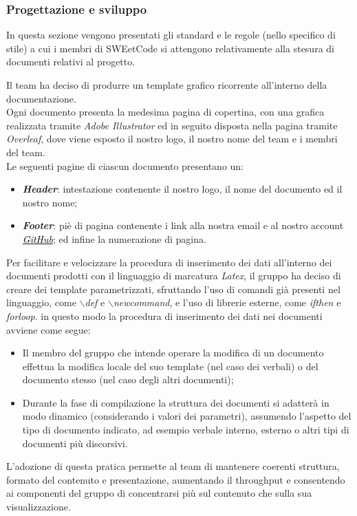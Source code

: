 \documentclass[10pt, a4paper]{article}
\begin{document}
\subsubsection{Progettazione e sviluppo}
In questa sezione vengono presentati gli standard e le regole (nello specifico di stile) a cui i membri di SWEetCode si attengono 
relativamente alla stesura di documenti relativi al progetto. 
    
    Il team ha deciso di produrre un template grafico ricorrente all'interno della documentazione.\\
    Ogni documento presenta la medesima pagina di copertina, con una grafica realizzata tramite \textit{Adobe Illustrator} ed in seguito 
    disposta nella pagina tramite \textit{Overleaf}, dove viene esposto il nostro logo, il nostro nome del team e i membri del team.\\
    Le seguenti pagine di ciascun documento presentano un:
        \begin{itemize}
            \item \textbf{\textit{Header}}: intestazione contenente il nostro logo, il nome del documento ed il nostro nome;
            \item \textbf{\textit{Footer}}: piè di pagina contenente i link alla nostra email e al nostro account \href{https://sweetcode-team.github.io/}{\textcolor{black}{\textit{GitHub\pg}}}; 
            ed infine la numerazione di pagina.
        \end{itemize}

     Per facilitare e velocizzare la procedura di inserimento dei dati all'interno dei documenti prodotti con 
    il linguaggio di marcatura \textit{Latex}, il gruppo ha deciso di creare dei template parametrizzati, sfruttando l'uso di comandi già 
    presenti nel linguaggio, come \textit{$\backslash$def} e \textit{$\backslash$newcommand}, e l'uso di librerie esterne, come 
    \textit{ifthen} e \textit{forloop}. in questo modo la procedura di inserimento dei dati nei documenti avviene come segue:
    \begin{itemize}
        \item Il membro del gruppo che intende operare la modifica di un documento effettua la modifica locale del suo template (nel caso dei verbali) o del documento stesso (nel caso degli altri documenti);
        \item Durante la fase di compilazione la struttura dei documenti si adatterà in modo dinamico (considerando i valori dei parametri), assumendo 
        l'aspetto del tipo di documento indicato, ad esempio verbale interno, esterno o altri tipi di documenti più discorsivi.
    \end{itemize}
    L'adozione di 
    questa pratica permette al team di mantenere coerenti struttura, formato del contenuto e presentazione, aumentando il throughput e 
    consentendo ai componenti del gruppo di concentrarsi più sul contenuto che sulla sua visualizzazione.
    
\end{document}
